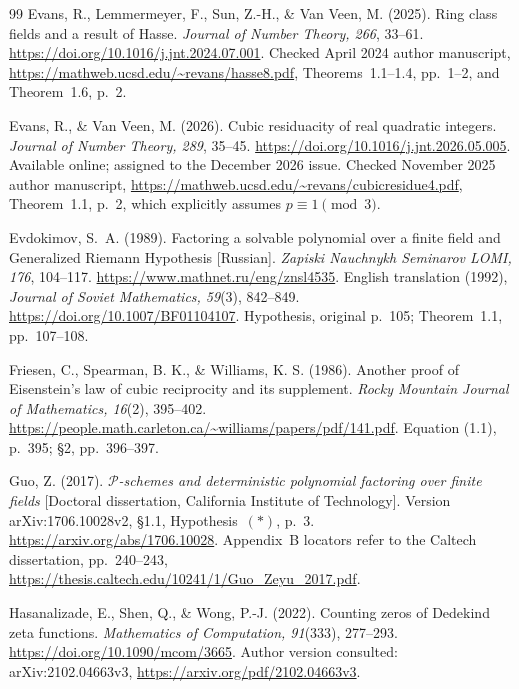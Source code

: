 \documentclass[11pt]{article}
\theoremstyle{definition}
\theoremstyle{remark}
\begin{document}
\begin{thebibliography}{99}
Evans, R., Lemmermeyer, F., Sun, Z.-H., \& Van Veen, M. (2025).
Ring class fields and a result of Hasse.
\emph{Journal of Number Theory, 266}, 33--61.
\url{https://doi.org/10.1016/j.jnt.2024.07.001}.
Checked April 2024 author manuscript,
\url{https://mathweb.ucsd.edu/~revans/hasse8.pdf},
Theorems~1.1--1.4, pp.~1--2, and Theorem~1.6, p.~2.

Evans, R., \& Van Veen, M. (2026).
Cubic residuacity of real quadratic integers.
\emph{Journal of Number Theory, 289}, 35--45.
\url{https://doi.org/10.1016/j.jnt.2026.05.005}.
Available online; assigned to the December 2026 issue.
Checked November 2025 author manuscript,
\url{https://mathweb.ucsd.edu/~revans/cubicresidue4.pdf},
Theorem~1.1, p.~2, which explicitly assumes $p\equiv1\pmod3$.

Evdokimov, S.~A. (1989).
Factoring a solvable polynomial over a finite field and Generalized
Riemann Hypothesis [Russian].
\emph{Zapiski Nauchnykh Seminarov LOMI, 176}, 104--117.
\url{https://www.mathnet.ru/eng/znsl4535}.
English translation (1992), \emph{Journal of Soviet Mathematics,
59}(3), 842--849. \url{https://doi.org/10.1007/BF01104107}.
Hypothesis, original p.~105; Theorem~1.1, pp.~107--108.

Friesen, C., Spearman, B. K., \& Williams, K. S. (1986).
Another proof of Eisenstein's law of cubic reciprocity and its supplement.
\emph{Rocky Mountain Journal of Mathematics, 16}(2), 395--402.
\url{https://people.math.carleton.ca/~williams/papers/pdf/141.pdf}.
Equation (1.1), p.~395; \S2, pp.~396--397.

Guo, Z. (2017).
\emph{$\mathcal P$-schemes and deterministic polynomial factoring over finite fields}
[Doctoral dissertation, California Institute of Technology].
Version arXiv:1706.10028v2, \S1.1, Hypothesis~$(*)$, p.~3.
\url{https://arxiv.org/abs/1706.10028}.
Appendix~B locators refer to the Caltech dissertation, pp.~240--243,
\url{https://thesis.caltech.edu/10241/1/Guo_Zeyu_2017.pdf}.

Hasanalizade, E., Shen, Q., \& Wong, P.-J. (2022).
Counting zeros of Dedekind zeta functions.
\emph{Mathematics of Computation, 91}(333), 277--293.
\url{https://doi.org/10.1090/mcom/3665}.
Author version consulted: arXiv:2102.04663v3,
\url{https://arxiv.org/pdf/2102.04663v3}.


\end{thebibliography}
\end{document}
